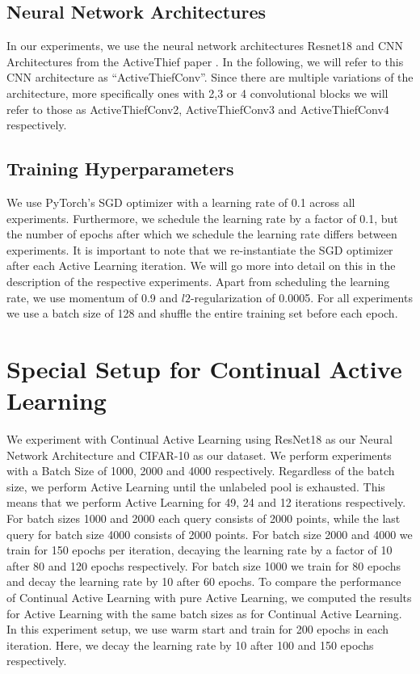 \subsection{Neural Network Architectures}
\label{sec:ExperimentSetup:NNArchitectures}
In our experiments, we use the neural network architectures Resnet18 \cite{he2016deep} and CNN Architectures from the ActiveThief paper \cite{pal2020activethief}.
In the following, we will refer to this CNN architecture as \enquote{ActiveThiefConv}. Since there are multiple variations of the architecture, more specifically ones with
2,3 or 4 convolutional blocks we will refer to those as ActiveThiefConv2, ActiveThiefConv3 and ActiveThiefConv4 respectively.


\subsection{Training Hyperparameters}
\label{sec:ExperimentSetup:Hyperparameters}
We use PyTorch's SGD optimizer with a learning rate of 0.1 across all experiments. Furthermore, we schedule the learning rate by a factor of 0.1, but the number of
epochs after which we schedule the learning rate differs between experiments. It is important to note that we re-instantiate the SGD optimizer after each Active Learning
iteration. We will go more into detail on this in the description of the respective experiments. Apart from scheduling the learning rate, we use momentum \cite{cutkosky2020momentum}
of 0.9 and $l2$-regularization of 0.0005. For all experiments we use a batch size of 128 and shuffle the entire training set before each epoch.


\section{Special Setup for Continual Active Learning}
\label{sec:Methodology:CALsetup}
We experiment with Continual Active Learning using ResNet18 as our Neural Network Architecture and CIFAR-10 as our dataset. We perform experiments with a Batch Size of 1000,
2000 and 4000 respectively. Regardless of the batch size, we perform Active Learning until the unlabeled pool is exhausted. This means that we perform Active Learning for
49, 24 and 12 iterations respectively. For batch sizes 1000 and 2000 each query consists of 2000 points, while the last query for batch size 4000 consists of 2000 points.
For batch size 2000 and 4000 we train for 150 epochs per iteration, decaying the learning rate by a factor of 10 after 80 and 120 epochs respectively. For batch size 1000 we
train for 80 epochs and decay the learning rate by 10 after 60 epochs. To compare the performance of Continual Active Learning with pure Active Learning, we computed the results
for Active Learning with the same batch sizes as for Continual Active Learning. In this experiment setup, we use warm start and train for 200 epochs in each iteration. Here, we
decay the learning rate by 10 after 100 and 150 epochs respectively.


